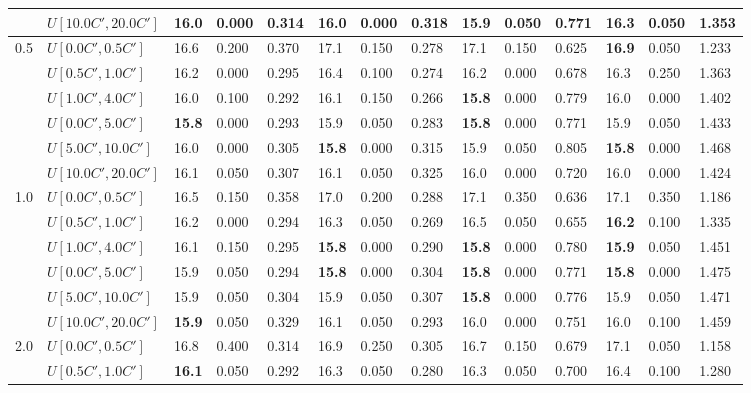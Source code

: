 \begin{table}[h]
{\begin{tabular}{|l|l||l|l|l||l|l|l||l|l|l||l|l|l|}
       & $U[10.0C',20.0C']$ & 16.0 & 0.000 & 0.314 & 16.0 & 0.000 & 0.318 & \textbf{15.9} & 0.050 & 0.771 & 16.3 & 0.050 & 1.353 \\
      \hline\hline
      \multirow{6}{*}{0.5} & $U[0.0C',0.5C']$ & 16.6 & 0.200 & 0.370 & 17.1 & 0.150 & 0.278 & 17.1 & 0.150 & 0.625 & \textbf{16.9} & 0.050 & 1.233 \\
       & $U[0.5C',1.0C']$ & 16.2 & 0.000 & 0.295 & 16.4 & 0.100 & 0.274 & 16.2 & 0.000 & 0.678 & 16.3 & 0.250 & 1.363 \\
       & $U[1.0C',4.0C']$ & 16.0 & 0.100 & 0.292 & 16.1 & 0.150 & 0.266 & \textbf{15.8} & 0.000 & 0.779 & 16.0 & 0.000 & 1.402 \\
       & $U[0.0C',5.0C']$ & \textbf{15.8} & 0.000 & 0.293 & 15.9 & 0.050 & 0.283 & \textbf{15.8} & 0.000 & 0.771 & 15.9 & 0.050 & 1.433 \\
       & $U[5.0C',10.0C']$ & 16.0 & 0.000 & 0.305 & \textbf{15.8} & 0.000 & 0.315 & 15.9 & 0.050 & 0.805 & \textbf{15.8} & 0.000 & 1.468 \\
       & $U[10.0C',20.0C']$ & 16.1 & 0.050 & 0.307 & 16.1 & 0.050 & 0.325 & 16.0 & 0.000 & 0.720 & 16.0 & 0.000 & 1.424 \\
      \hline\hline
      \multirow{6}{*}{1.0} & $U[0.0C',0.5C']$ & 16.5 & 0.150 & 0.358 & 17.0 & 0.200 & 0.288 & 17.1 & 0.350 & 0.636 & 17.1 & 0.350 & 1.186 \\
       & $U[0.5C',1.0C']$ & 16.2 & 0.000 & 0.294 & 16.3 & 0.050 & 0.269 & 16.5 & 0.050 & 0.655 & \textbf{16.2} & 0.100 & 1.335 \\
       & $U[1.0C',4.0C']$ & 16.1 & 0.150 & 0.295 & \textbf{15.8} & 0.000 & 0.290 & \textbf{15.8} & 0.000 & 0.780 & \textbf{15.9} & 0.050 & 1.451 \\
       & $U[0.0C',5.0C']$ & 15.9 & 0.050 & 0.294 & \textbf{15.8} & 0.000 & 0.304 & \textbf{15.8} & 0.000 & 0.771 & \textbf{15.8} & 0.000 & 1.475 \\
       & $U[5.0C',10.0C']$ & 15.9 & 0.050 & 0.304 & 15.9 & 0.050 & 0.307 & \textbf{15.8} & 0.000 & 0.776 & 15.9 & 0.050 & 1.471 \\
       & $U[10.0C',20.0C']$ & \textbf{15.9} & 0.050 & 0.329 & 16.1 & 0.050 & 0.293 & 16.0 & 0.000 & 0.751 & 16.0 & 0.100 & 1.459 \\
      \hline\hline
      \multirow{6}{*}{2.0} & $U[0.0C',0.5C']$ & 16.8 & 0.400 & 0.314 & 16.9 & 0.250 & 0.305 & 16.7 & 0.150 & 0.679 & 17.1 & 0.050 & 1.158 \\
       & $U[0.5C',1.0C']$ & \textbf{16.1} & 0.050 & 0.292 & 16.3 & 0.050 & 0.280 & 16.3 & 0.050 & 0.700 & 16.4 & 0.100 & 1.280 \\

\end{tabular}}
\end{table}
